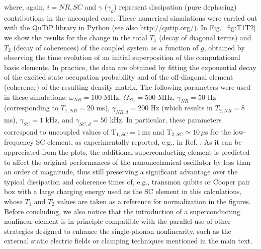\documentclass[aps,twocolumn,groupedaddress,superscriptaddress,floatfix,amsmath,amssymb,prb]{revtex4-1}
\begin{document}
where, again, $i = NR,SC$ and $\gamma$ ($\gamma_d$) represent dissipation (pure dephasing) contributions in the uncoupled case. These numerical simulations were carried out with the QuTiP library in Python\cite{Qtip} (see also http://qutip.org/). In Fig.~\ref{fig:T1T2} we show the results for the change in the total $T_1$ (decay of diagonal terms) and $T_2$ (decay of coherences) of the coupled system as a function of $g$, obtained by observing the time evolution of an initial superposition of the computational basis elements. In practice, the data are obtained by fitting the exponential decay of the excited state occupation probability and of the off-diagonal element (coherence) of the resulting density matrix. The following parameters were used in these simulations: $\omega_{NR} = 100$ MHz, $\Omega_{SC} = 500$ MHz, $\gamma_{NR}  = 50$ Hz (corresponding to $T_{1,NR} = 20$ ms), $\gamma_{NR,d} = 200$ Hz (which results in $T_{2,NR} = 8$ ms), $\gamma_{SC} = 1$ kHz, and $\gamma_{SC,d} = 50$ kHz. 
In particular, these parameters correspond to uncoupled values of {$\text{T}_{1,SC} = 1\,$ms and $\text{T}_{2,SC} \simeq 10\,\mu$s}  for the low-frequency SC element, as experimentally reported, e.g., in Ref. . 
As it can be appreciated from the plots, the additional superconducting element is predicted to affect the original performances of the nanomechanical oscillator by less than an order of magnitude, thus still preserving a significant advantage over the typical dissipation and coherence times of, e.g., transmon qubits or Cooper pair box with a large charging energy used as the SC element in this calculations, whose $T_1$ and $T_2$ values are taken as a reference for normalization in the figures. 
Before concluding, we also notice that the introduction of a superconducting nonlinear element is in principle compatible with the parallel use of other strategies designed to enhance the single-phonon nonlinearity, such as the external static electric fields or clamping techniques mentioned in the main text.
\end{document}
